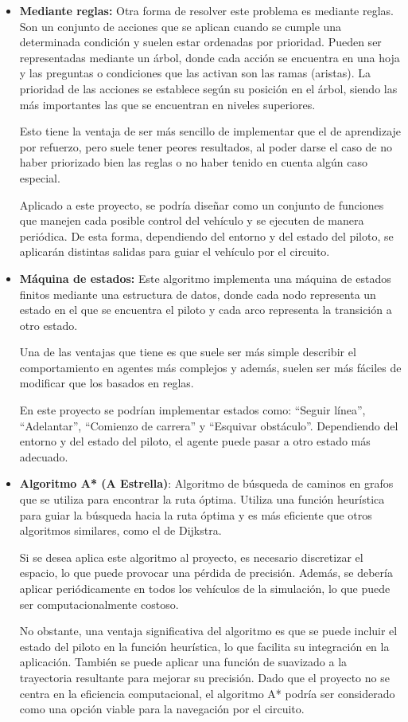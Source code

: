 \documentclass[a4paper,11pt]{book}
\begin{document}
\begin{itemize}
   \item \textbf{Mediante reglas:} Otra forma de resolver este problema es mediante reglas. Son un conjunto de acciones que se aplican cuando se cumple una determinada condición y suelen estar ordenadas por prioridad. Pueden ser representadas mediante un árbol, donde cada acción se encuentra en una hoja y las preguntas o condiciones que las activan son las ramas (aristas). La prioridad de las acciones se establece según su posición en el árbol, siendo las más importantes las que se encuentran en niveles superiores.
   
   Esto tiene la ventaja de ser más sencillo de implementar que el de aprendizaje por refuerzo, pero suele tener peores resultados, al poder darse el caso de no haber priorizado bien las reglas o no haber tenido en cuenta algún caso especial.


   Aplicado a este proyecto, se podría diseñar como un conjunto de funciones que manejen cada posible control del vehículo y se ejecuten de manera periódica. De esta forma, dependiendo del entorno y del estado del piloto, se aplicarán distintas salidas para guiar el vehículo por el circuito.

   \item \textbf{Máquina de estados:} Este algoritmo implementa una máquina de estados finitos mediante una estructura de datos, donde cada nodo representa un estado en el que se encuentra el piloto y cada arco representa la transición a otro estado. 
   
   Una de las ventajas que tiene es que suele ser más simple describir el comportamiento en agentes más complejos y además, suelen ser más fáciles de modificar que los basados en reglas.

   En este proyecto se podrían implementar estados como: ``Seguir línea'', ``Adelantar'', ``Comienzo de carrera'' y ``Esquivar obstáculo''. Dependiendo del entorno y del estado del piloto, el agente puede pasar a otro estado más adecuado.

   \item \textbf{Algoritmo A* (A Estrella)}: Algoritmo de búsqueda de caminos en grafos que se utiliza para encontrar la ruta óptima. Utiliza una función heurística para guiar la búsqueda hacia la ruta óptima y es más eficiente que otros algoritmos similares, como el de Dijkstra.
   
   Si se desea aplica este algoritmo al proyecto, es necesario discretizar el espacio, lo que puede provocar una pérdida de precisión. Además, se debería aplicar periódicamente en todos los vehículos de la simulación, lo que puede ser computacionalmente costoso.

   No obstante, una ventaja significativa del algoritmo es que se puede incluir el estado del piloto en la función heurística, lo que facilita su integración en la aplicación. También se puede aplicar una función de suavizado a la trayectoria resultante para mejorar su precisión. Dado que el proyecto no se centra en la eficiencia computacional, el algoritmo A* podría ser considerado como una opción viable para la navegación por el circuito.
\end{itemize}
\end{document}
